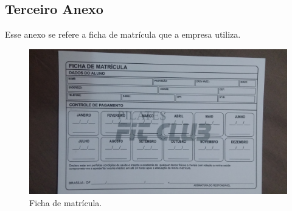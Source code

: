 \begin{anexosenv}
\chapter{Terceiro Anexo}
Esse anexo se refere a ficha de matrícula que a empresa utiliza.
\begin{figure}[h!]
    \centering
    \includegraphics[width=\textwidth, angle=180]{figuras/matricula.jpg}
    \caption{Ficha de matrícula.}
    \label{fig:matricula}
\end{figure}

\end{anexosenv}
